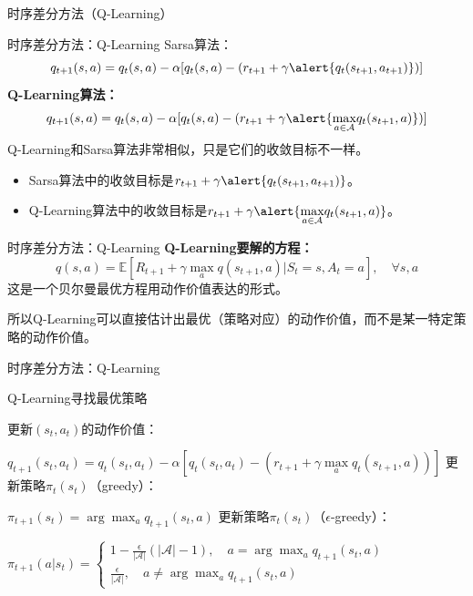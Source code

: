 \begin{section}{时序差分方法\alert{（Q-Learning）}}
\begin{frame}{时序差分方法：Q-Learning}
    Sarsa算法：
    \[
        q_{t+1}(s,a)=q_t(s,a)-\alpha[q_t(s,a)-(r_{t+1}+\gamma \alert{q_t(s_{t+1},a_{t+1})})]
    \]
    \textbf{Q-Learning算法：}
    \[
        q_{t+1}(s,a)=q_t(s,a)-\alpha[q_t(s,a)-(r_{t+1}+\gamma \alert{\underset{a\in\mathcal{A}}{\max}q_t(s_{t+1},a)})]
    \]
    Q-Learning和Sarsa算法非常相似，只是它们的收敛目标不一样。
    \begin{itemize}
        \item Sarsa算法中的收敛目标是$r_{t+1}+\gamma \alert{q_t(s_{t+1},a_{t+1})}$。
        \item Q-Learning算法中的收敛目标是$r_{t+1}+\gamma \alert{\underset{a\in\mathcal{A}}{\max}q_t(s_{t+1},a)}$。
    \end{itemize}
\end{frame}

\begin{frame}{时序差分方法：Q-Learning}
    \textbf{Q-Learning要解的方程：}
    \[
        q(s,a)=\mathbb{E}[R_{t+1}+\gamma\underset{a}{\max}q(s_{t+1}, a)| S_t=s, A_t=a], \quad \forall s,a
    \]
    这是一个贝尔曼\alert{最优}方程用动作价值表达的形式。

    所以Q-Learning可以直接估计出\alert{最优（策略对应）的动作价值}，而不是某一特定策略的动作价值。
\end{frame}

\begin{frame}{时序差分方法：Q-Learning}
    \vspace{-0.2cm}
    \begin{block}{Q-Learning寻找最优策略}
        \begin{algorithmic}[1]
            \setlength{\baselineskip}{0.5\baselineskip}
                \State 更新$(s_t, a_t)$的动作价值：

                $
                    q_{t+1}(s_t,a_t)=q_t(s_t,a_t)-\alpha[q_t(s_t,a_t)-(r_{t+1}+\gamma \underset{a}{\max}q_t(s_{t+1},a))]
                $
                \State 更新策略$\pi_t(s_t)$（greedy）：

                $
                    \pi_{t+1}(s_t)=\arg\max_a q_{t+1}(s_t,a)
                $
                \State 更新策略$\pi_t(s_t)$（$\epsilon$-greedy）：
                
                $
                    \pi_{t+1}(a|s_{t})=\begin{cases}
                        1-\frac{\epsilon}{|\mathcal{A}|}(|\mathcal{A}|-1),\quad a=\arg\max_{a}q_{t+1}(s_t,a) \\
                        \frac{\epsilon}{|\mathcal{A}|},\quad a \neq \arg\max_{a}q_{t+1}(s_t,a)
                    \end{cases}
                $
            \EndFor
        \end{algorithmic}
    \end{block}
\end{frame}


\end{section}
